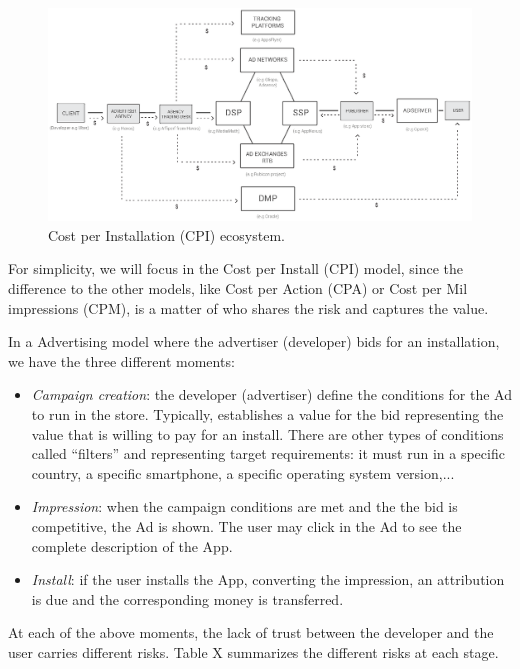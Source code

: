 \begin{figure}[!ht]
\centering
\includegraphics[width=\textwidth]{diagrams/cpi_flow.eps}
\caption{Cost per Installation (CPI) ecosystem.}
\label{fig:exist_flows}
\end{figure}

For simplicity, we will focus in the Cost per Install (CPI) model, since the difference to the other models, like Cost per Action (CPA) or Cost per Mil impressions (CPM), is a matter of who shares the risk and captures the value.

In a Advertising model where the advertiser (developer) bids for an installation, we have the three different moments:


\begin{itemize}
\item {\em Campaign creation}: the developer (advertiser) define the conditions for the Ad to run in the store. Typically, establishes a value for the bid representing the value that is willing to pay for an install. There are other types of conditions called ``filters'' and representing target requirements: it must run in a specific country, a specific smartphone, a specific operating system version,...
\item {\em Impression}: when the campaign conditions are met and the the bid is competitive, the Ad is shown. The user may click in the Ad to see the complete description of the App.
\item {\em Install}: if the user installs the App, converting the impression, an attribution is due and the corresponding money is transferred.
\end{itemize}


At each of the above moments, the lack of trust between the developer and the user carries different risks. Table X summarizes the different risks at each stage.


